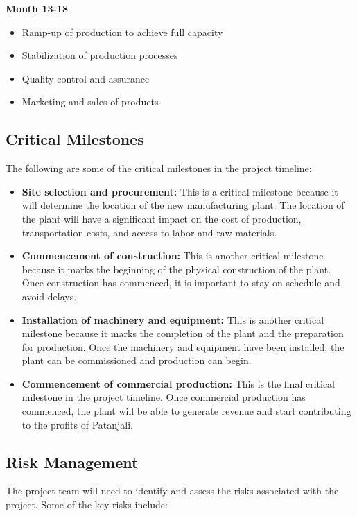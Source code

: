 \textbf{Month 13-18}

\begin{itemize}
    \item Ramp-up of production to achieve full capacity
    \item Stabilization of production processes
    \item Quality control and assurance
    \item Marketing and sales of products
\end{itemize}

\subsection{Critical Milestones}

The following are some of the critical milestones in the project timeline:

\begin{itemize}
    \item \textbf{Site selection and procurement:} This is a critical milestone because it will determine the location of the new manufacturing plant. The location of the plant will have a significant impact on the cost of production, transportation costs, and access to labor and raw materials.
    \item \textbf{Commencement of construction:} This is another critical milestone because it marks the beginning of the physical construction of the plant. Once construction has commenced, it is important to stay on schedule and avoid delays.
    \item \textbf{Installation of machinery and equipment:} This is another critical milestone because it marks the completion of the plant and the preparation for production. Once the machinery and equipment have been installed, the plant can be commissioned and production can begin.
    \item \textbf{Commencement of commercial production:} This is the final critical milestone in the project timeline. Once commercial production has commenced, the plant will be able to generate revenue and start contributing to the profits of Patanjali.
\end{itemize}

\subsection{Risk Management}

The project team will need to identify and assess the risks associated with the project. Some of the key risks include:

